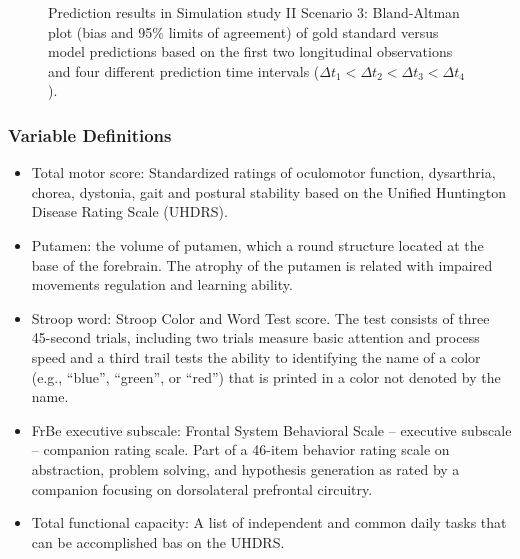 \begin{figure}[H]
\centering
{}
{}
  \caption{Prediction results in Simulation study II Scenario 3: Bland-Altman plot (bias and 95\% limits of agreement) of gold standard versus model predictions based on the first two longitudinal observations and four different prediction time intervals ($\Delta t_1 < \Delta t_2 < \Delta t_3 < \Delta t_4$).}
  \label{plot:sim2fig2}
\end{figure}



\subsubsection{Variable Definitions}\label{sec:appendix_var_description}
\begin{itemize}
\item {Total motor score}: Standardized ratings of oculomotor function, dysarthria, chorea, dystonia, gait and postural stability based on the Unified Huntington Disease Rating Scale (UHDRS).

\item {Putamen}: the volume of putamen, which a round structure located at the base of the forebrain. The atrophy of the putamen is related with impaired movements regulation and learning ability.

\item {Stroop word}: Stroop Color and Word Test score. The test consists of three 45-second trials, including two trials measure basic attention and process speed and a third trail tests the ability to identifying the name of a color (e.g., ``blue'', ``green'', or ``red'') that is printed in a color not denoted by the name.

\item {FrBe executive subscale}: Frontal System Behavioral Scale -- executive subscale -- companion rating scale. Part of a 46-item behavior rating scale on abstraction, problem solving, and hypothesis generation as rated by a companion focusing on dorsolateral prefrontal circuitry.

\item {Total functional capacity}: A list of independent and common daily tasks that can be accomplished bas on the UHDRS.

\end{itemize}



